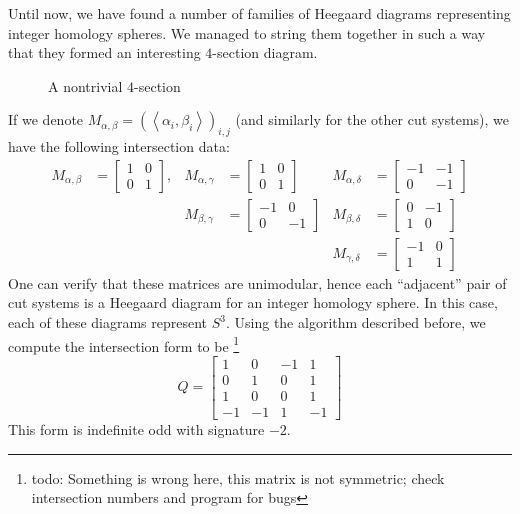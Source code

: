 Until now, we have found a number of families of Heegaard diagrams representing integer homology spheres. We managed to string them together in such a way that they formed an interesting $4$-section diagram.
\begin{figure}[H]
    \centering
    \caption{A nontrivial $4$-section}
    \label{fig:4-section}
\end{figure}
If we denote $M_{\alpha,\beta} = \left(\left< \alpha_i, \beta_i \right>\right)_{i,j}$ (and similarly for the other cut systems), we have the following intersection data:
\begin{align*}
	M_{\alpha,\beta} &= \begin{bmatrix} 1 & 0\\0 & 1 \end{bmatrix}, & M_{\alpha,\gamma} &= \begin{bmatrix} 1 & 0\\0 & 1 \end{bmatrix} & M_{\alpha,\delta} &= \begin{bmatrix} -1 & -1\\0 & -1 \end{bmatrix} \\
	&& M_{\beta,\gamma} &= \begin{bmatrix} -1 & 0\\0 & -1 \end{bmatrix} & M_{\beta,\delta} &= \begin{bmatrix} 0 & -1\\1 & 0 \end{bmatrix} \\
	&&&& M_{\gamma,\delta} &= \begin{bmatrix} -1 & 0\\1 & 1 \end{bmatrix} 
\end{align*}
One can verify that these matrices are unimodular, hence each ``adjacent'' pair of cut systems is a Heegaard diagram for an integer homology sphere. In this case, each of these diagrams represent $S^3$. Using the algorithm described before, we compute the intersection form to be \footnote{todo: Something is wrong here, this matrix is not symmetric; check intersection numbers and program for bugs} \[Q = \begin{bmatrix} 1 & 0 & -1 & 1\\0 & 1 & 0 & 1\\1 & 0 & 0 & 1\\-1 & -1 & 1 & -1 \end{bmatrix} \] This form is indefinite odd with signature $-2$.

